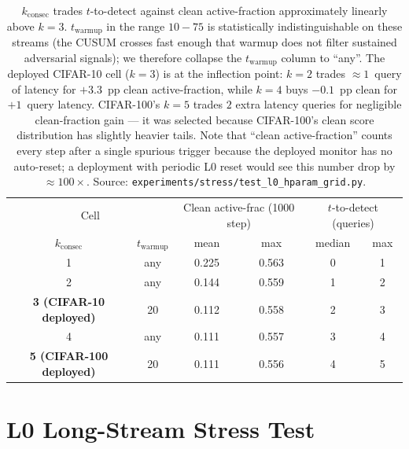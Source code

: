 \begin{table}[h]
\centering
\small
\begin{tabular}{cccccc}
\toprule
\multicolumn{2}{c}{Cell} & \multicolumn{2}{c}{Clean active-frac (1000 step)} & \multicolumn{2}{c}{$t$-to-detect (queries)} \\
$k_\text{consec}$ & $t_\text{warmup}$ & mean & max & median & max \\
\midrule
1 & any & 0.225 & 0.563 & 0 & 1 \\
2 & any & 0.144 & 0.559 & 1 & 2 \\
\textbf{3 (CIFAR-10 deployed)} & 20 & 0.112 & 0.558 & 2 & 3 \\
4 & any & 0.111 & 0.557 & 3 & 4 \\
\textbf{5 (CIFAR-100 deployed)} & 20 & 0.111 & 0.556 & 4 & 5 \\
\bottomrule
\end{tabular}
\caption{$k_\text{consec}$ trades $t$-to-detect against clean
active-fraction approximately linearly above $k{=}3$. $t_\text{warmup}$
in the range $10{-}75$ is statistically indistinguishable on these
streams (the CUSUM crosses fast enough that warmup does not filter
sustained adversarial signals); we therefore collapse the $t_\text{warmup}$
column to ``any''. The deployed CIFAR-10 cell ($k{=}3$) is at the
inflection point: $k{=}2$ trades $\approx 1$~query of latency for
$+3.3$~pp clean active-fraction, while $k{=}4$ buys $-0.1$~pp clean for
$+1$~query latency. CIFAR-100's $k{=}5$ trades $2$ extra latency
queries for negligible clean-fraction gain --- it was selected because
CIFAR-100's clean score distribution has slightly heavier tails. Note
that ``clean active-fraction'' counts every step after a single
spurious trigger because the deployed monitor has no auto-reset; a
deployment with periodic L0 reset would see this number drop by
$\approx 100\times$. Source:
\texttt{experiments/stress/test\_l0\_hparam\_grid.py}.}
\label{tab:hparam_grid}
\end{table}


\section{L0 Long-Stream Stress Test}
\label{app:l0_stress}

